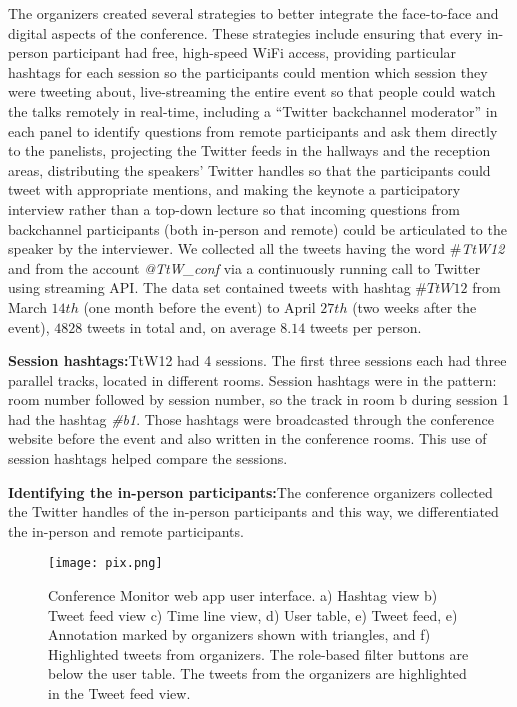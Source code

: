 \documentclass[conference,final]{IEEEtran}
\begin{document}
The organizers created several strategies to better integrate the face-to-face and digital aspects of the conference. These strategies include ensuring that every in-person participant had free, high-speed WiFi access, providing particular hashtags for each session so the participants could mention which session they were tweeting about, live-streaming the entire event so that people could watch the talks remotely in real-time, including a ``Twitter backchannel moderator'' in each panel to identify questions from remote participants and ask them directly to the panelists, projecting the Twitter feeds in the hallways and the reception areas, distributing the speakers' Twitter handles so that the participants could tweet with appropriate mentions, and making the keynote a participatory interview rather than a top-down lecture so that incoming questions from backchannel participants (both in-person and remote) could be articulated to the speaker by the interviewer.
We collected all the tweets having the word \textit{$\#$TtW12} and from the account \textit{@TtW\_conf} via a continuously running call to Twitter using streaming API. The data set contained tweets with hashtag $\#TtW12$ from March $14th$ (one month before the event) to April $27th$ (two weeks after the event), $4828$ tweets in total and, on average $8.14$ tweets per person. 

\textbf{Session hashtags:}TtW12 had 4 sessions. The first three sessions each had three parallel tracks, located in different rooms. Session hashtags were in the pattern: room number followed by session number, so the track in room b during session 1 had the hashtag \textit{\#b1}. Those hashtags were broadcasted through the conference website before the event and also written in the conference rooms. This use of session hashtags helped compare the sessions.

\textbf{Identifying the in-person participants:}The conference organizers collected the Twitter handles of the in-person participants and this way, we differentiated the in-person and remote participants. 

\begin{figure*}[htbp]
	\centering
		\texttt{[image: pix.png]}
	\caption{Conference Monitor web app user interface. a) Hashtag view b) Tweet feed view c) Time line view, d) User table, e) Tweet feed, e) Annotation marked by organizers shown with triangles, and f) Highlighted tweets from organizers. The role-based filter buttons are below the user table. The tweets from the organizers are highlighted in the Tweet feed view.}
	\label{fig:pix}
\end{figure*}
\end{document}
